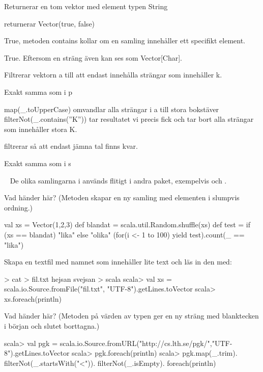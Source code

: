 {{\SubtaskSolved 
Returnerar en tom vektor med element typen String

\SubtaskSolved 
returnerar Vector(true, false)

\SubtaskSolved 
True, metoden contains kollar om en samling innehåller ett specifikt element.

\SubtaskSolved 
True. Eftersom en sträng även kan ses som Vector[Char].

\SubtaskSolved 
Filtrerar vektorn a till att endast innehålla strängar som innehåller k.

\SubtaskSolved 
Exakt samma som i p

\SubtaskSolved 
map(\_.toUpperCase) omvandlar alla strängar i a till stora bokstäver
filterNot(\_.contains(''K'')) tar resultatet vi precis fick och tar bort alla strängar som innehåller stora K.

\SubtaskSolved 
filtrerar så att endast jämna tal finns kvar.

\SubtaskSolved 
Exakt samma som i s




\QUESTEND









\QUESTBEGIN

\Task  \what~ De olika samlingarna i  används flitigt i andra paket, exempelvis  och .

\Subtask Vad händer här? (Metoden  skapar en ny samling med elementen i slumpvis ordning.)
\begin{REPL}
val xs = Vector(1,2,3)
def blandat = scala.util.Random.shuffle(xs)
def test = if (xs == blandat) "lika" else "olika"
(for(i <- 1 to 100) yield test).count(_ == "lika")
\end{REPL}


\Subtask Skapa en textfil med namnet  som innehåller lite text och läs in den med: \\
\begin{REPL}
> cat > fil.txt
hejsan
svejsan
> scala
scala> val xs = scala.io.Source.fromFile("fil.txt", "UTF-8").getLines.toVector
scala> xs.foreach(println)
\end{REPL}


\Subtask Vad händer här? (Metoden  på värden av typen  ger en ny sträng med blanktecken i början och slutet borttagna.)
\begin{REPL}
scala> val pgk =
  scala.io.Source.fromURL("http://cs.lth.se/pgk/","UTF-8").getLines.toVector
scala> pgk.foreach(println)
scala> pgk.map(_.trim).
         filterNot(_.startsWith("<")).
         filterNot(_.isEmpty).
         foreach(println)
\end{REPL}



}}
